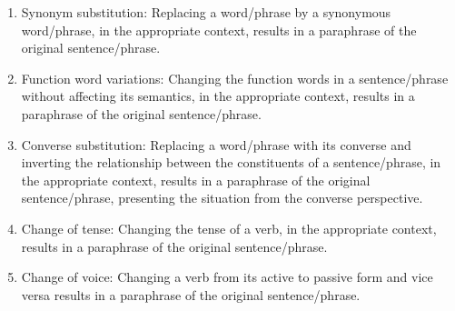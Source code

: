 \begin{enumerate}
    \item Synonym substitution: Replacing a word/phrase by a synonymous word/phrase, in the appropriate context, results in a paraphrase of the original sentence/phrase.
    \item Function word variations: Changing the function words in a sentence/phrase without affecting its semantics, in the appropriate context, results in a paraphrase of the original sentence/phrase.
    
    \item Converse substitution: Replacing a word/phrase with its converse and inverting the relationship between the constituents of a sentence/phrase, in the appropriate context, results in a paraphrase of the original sentence/phrase, presenting the situation from the converse perspective.
    \item Change of tense: Changing the tense of a verb, in the appropriate context, results in a paraphrase of the original sentence/phrase.
    \item Change of voice: Changing a verb from its active to passive form and vice versa results in a paraphrase of the original sentence/phrase.
    

\end{enumerate}
